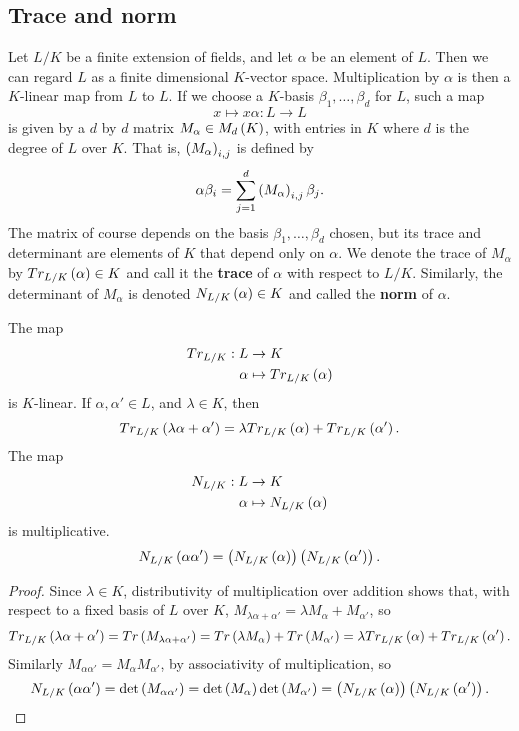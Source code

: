 \subsection{Trace and norm}

Let $ L / K $ be a finite extension of fields, and let $ \alpha $ be an element of $ L $. Then we can regard $ L $ as a finite dimensional $ K $-vector space. Multiplication by $ \alpha $ is then a $ K $-linear map from $ L $ to $ L $. If we choose a $ K $-basis $ \beta_1, \dots, \beta_d $ for $ L $, such a map
$$ x \mapsto x\alpha : L \to L $$
is given by a $ d $ by $ d $ matrix $ M_\alpha \in M_d\left( K \right) $, with entries in $ K $ where $ d $ is the degree of $ L $ over $ K $. That is, $ \left( M_\alpha \right)_{i, j} $ is defined by
$$ \alpha\beta_i = \sum_{j = 1}^d \left( M_\alpha \right)_{i, j}\beta_j. $$
The matrix of course depends on the basis $ \beta_1, \dots, \beta_d $ chosen, but its trace and determinant are elements of $ K $ that depend only on $ \alpha $. We denote the trace of $ M_\alpha $ by $ Tr_{L / K}\left( \alpha \right) \in K $ and call it the \textbf{trace} of $ \alpha $ with respect to $ L / K $. Similarly, the determinant of $ M_\alpha $ is denoted $ N_{L / K}\left( \alpha \right) \in K $ and called the \textbf{norm} of $ \alpha $.

\begin{lemma}
The map
\begin{align*}
Tr_{L / K} : L & \to K \\
\alpha & \mapsto Tr_{L / K}\left( \alpha \right)
\end{align*}
is $ K $-linear. If $ \alpha, \alpha' \in L $, and $ \lambda \in K $, then
$$ Tr_{L / K}\left( \lambda\alpha + \alpha' \right) = \lambda Tr_{L / K}\left( \alpha \right) + Tr_{L / K}\left( \alpha' \right). $$
The map
\begin{align*}
N_{L / K} : L & \to K \\
\alpha & \mapsto N_{L / K}\left( \alpha \right)
\end{align*}
is multiplicative.
$$ N_{L / K}\left( \alpha\alpha' \right) = \left( N_{L / K}\left( \alpha \right) \right)\left( N_{L / K}\left( \alpha' \right) \right). $$
\end{lemma}

\begin{proof}
Since $ \lambda \in K $, distributivity of multiplication over addition shows that, with respect to a fixed basis of $ L $ over $ K $, $ M_{\lambda\alpha + \alpha'} = \lambda M_\alpha + M_{\alpha'} $, so
$$ Tr_{L / K}\left( \lambda\alpha + \alpha' \right) = Tr\left( M_{\lambda\alpha + \alpha'} \right) = Tr\left( \lambda M_\alpha \right) + Tr\left( M_{\alpha'} \right) = \lambda Tr_{L / K}\left( \alpha \right) + Tr_{L / K}\left( \alpha' \right). $$
Similarly $ M_{\alpha\alpha'} = M_\alpha M_{\alpha'} $, by associativity of multiplication, so
$$ N_{L / K}\left( \alpha\alpha' \right) = \det\left( M_{\alpha\alpha'} \right) = \det\left( M_\alpha \right)\det\left( M_{\alpha'} \right) = \left( N_{L / K}\left( \alpha \right) \right)\left( N_{L / K}\left( \alpha' \right) \right). $$
\end{proof}

